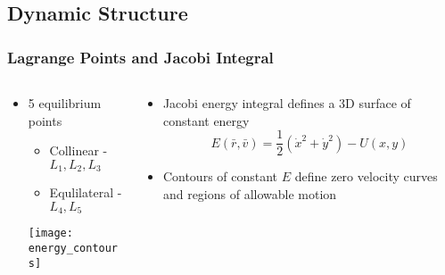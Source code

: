 \subsection*{Dynamic Structure}
\begin{frame} %
\frametitle{Lagrange Points and Jacobi Integral}
\begin{columns}
\begin{column}{0.5\textwidth}
  \begin{itemize}
  \item \num{5} equilibrium points 
  \begin{itemize}
  	\item Collinear - \( L_1, L_2, L_3\)
  	\item Equlilateral - \( L_4, L_5\)
    \end{itemize}  
	\texttt{[image: energy\_contours]}
 \end{itemize}
 \end{column}
 \begin{column}{0.5\textwidth}
 \begin{itemize}
 	\item Jacobi energy integral defines a 3D surface of constant energy
 	  \begin{equation*}
		E\left( \bar{r} , \bar{v} \right) = \frac{1}{2}\left( \dot{x}^2 + \dot{y}^2\right) - U\left(x,y \right)
	\label{eq:jacobi}
	\end{equation*}
	\item Contours of constant \( E\) define zero velocity curves and regions of allowable motion
	\end{itemize}
 \end{column}
 \end{columns}
\end{frame}   %
